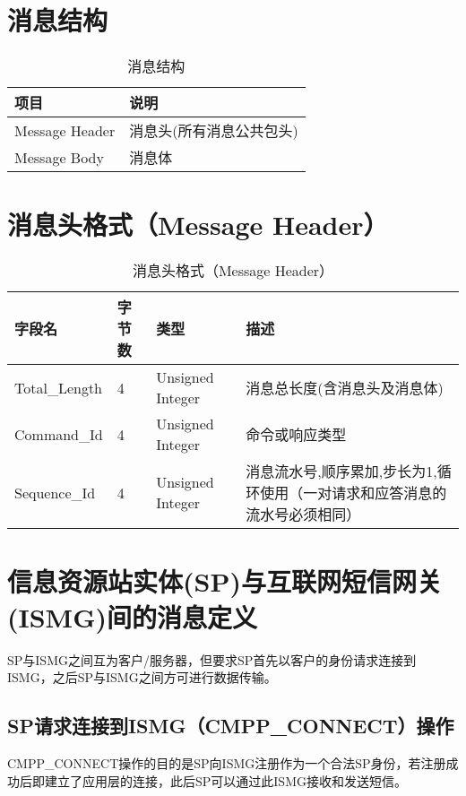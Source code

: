 \documentclass[11pt]{book} %
\begin{document}
\section{消息结构}

\begin{table}[htbp]
\centering
\caption{消息结构}
\begin{tabular}{|m{80pt}|m{250pt}|}
\hline
项目 &说明\\
\hline
Message Header& 消息头(所有消息公共包头)\\
\hline
Message Body& 消息体\\
\hline
\end{tabular}
\end{table}


\section{消息头格式（Message Header）}


\begin{table}[htbp]
\centering
\caption{消息头格式（Message Header）}
\begin{tabular}{|m{60pt}|m{40pt}|m{85pt}|m{120pt}|}
\hline
字段名 & 字节数& 类型& 描述\\
\hline
Total\_Length	& 4 & Unsigned  Integer& 消息总长度(含消息头及消息体)\\
\hline
Command\_Id & 4 & Unsigned Integer & 命令或响应类型 \\
\hline
Sequence\_Id& 4 & Unsigned Integer& 消息流水号,顺序累加,步长为1,循环使用（一对请求和应答消息的流水号必须相同）\\
\hline
\end{tabular}
\end{table}




\section{信息资源站实体(SP)与互联网短信网关(ISMG)间的消息定义}

SP与ISMG之间互为客户/服务器，但要求SP首先以客户的身份请求连接到ISMG，之后SP与ISMG之间方可进行数据传输。


\subsection{SP请求连接到ISMG（CMPP\_CONNECT）操作	}


CMPP\_CONNECT操作的目的是SP向ISMG注册作为一个合法SP身份，若注册成功后即建立了应用层的连接，此后SP可以通过此ISMG接收和发送短信。
\end{document}
